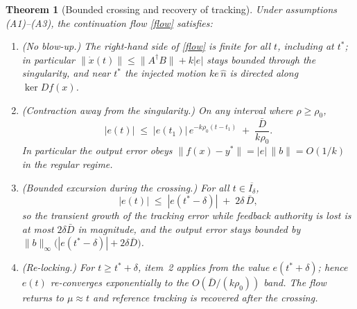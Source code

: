 \documentclass[11pt,american]{article}
\newtheorem{theorem}{Theorem}
\theoremstyle{definition}
\theoremstyle{plain}
\theoremstyle{remark}
\begin{document}
\begin{theorem}[Bounded crossing and recovery of tracking]\label{thm:crossing}
Under assumptions (A1)--(A3), the continuation flow \eqref{flow} satisfies:
\begin{enumerate}
\item[1.] (No blow-up.) The right-hand side of \eqref{flow} is finite for all $t$, including at $t^*$; in particular $\|\dot x(t)\| \le \|A^\dagger B\| + k|e|$ stays bounded through the singularity, and near $t^*$ the injected motion $k e\, \hat n$ is directed along $\ker D f(x)$.
\item[2.] (Contraction away from the singularity.) On any interval where $\rho \ge \rho_0$,
\[
|e(t)| \;\le\; |e(t_1)|\, e^{-k \rho_0 (t - t_1)} \;+\; \frac{\bar D}{k \rho_0}.
\]
In particular the output error obeys $\| f(x) - y^* \| = |e|\, \|b\| = O(1/k)$ in the regular regime.
\item[3.] (Bounded excursion during the crossing.) For all $t \in \overline{I_\delta}$,
\[
|e(t)| \;\le\; |e(t^*-\delta)| \;+\; 2\delta\, \bar D ,
\]
so the transient growth of the tracking error while feedback authority is lost is at most $2\delta\bar D$ in magnitude, and the output error stays bounded by $\|b\|_\infty\bigl(|e(t^*-\delta)| + 2\delta\bar D\bigr)$.
\item[4.] (Re-locking.) For $t \ge t^* + \delta$, item~2 applies from the value $e(t^*+\delta)$; hence $e(t)$ re-converges exponentially to the $O(\bar D/(k\rho_0))$ band. The flow returns to $\mu \approx t$ and reference tracking is recovered after the crossing.
\end{enumerate}
\end{theorem}
\end{document}
